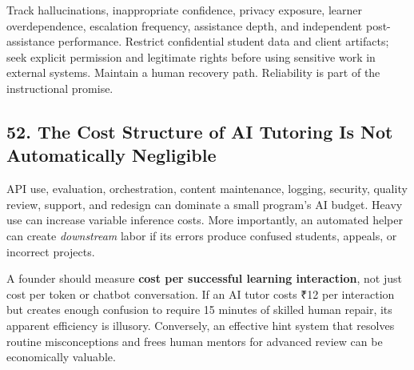 Track hallucinations, inappropriate confidence, privacy exposure, learner overdependence, escalation frequency, assistance depth, and independent post-assistance performance. Restrict confidential student data and client artifacts; seek explicit permission and legitimate rights before using sensitive work in external systems. Maintain a human recovery path. Reliability is part of the instructional promise.

\subsection*{52. The Cost Structure of AI Tutoring Is Not Automatically Negligible}

API use, evaluation, orchestration, content maintenance, logging, security, quality review, support, and redesign can dominate a small program's AI budget. Heavy use can increase variable inference costs. More importantly, an automated helper can create \emph{downstream} labor if its errors produce confused students, appeals, or incorrect projects.

A founder should measure \textbf{cost per successful learning interaction}, not just cost per token or chatbot conversation. If an AI tutor costs ₹12 per interaction but creates enough confusion to require 15 minutes of skilled human repair, its apparent efficiency is illusory. Conversely, an effective hint system that resolves routine misconceptions and frees human mentors for advanced review can be economically valuable.
